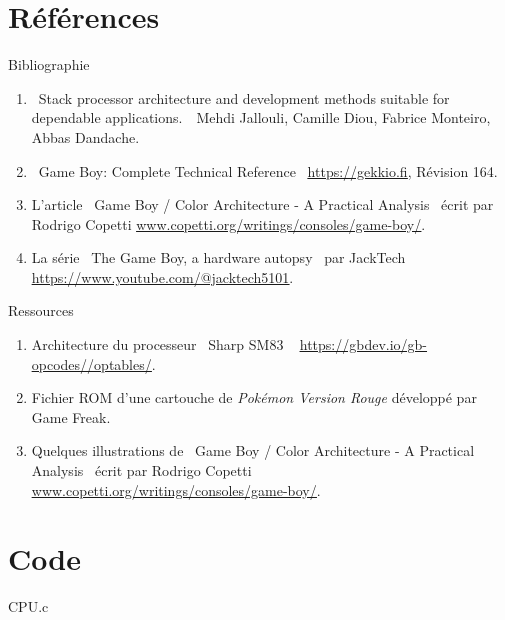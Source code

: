 \documentclass{beamer}
\begin{document}
    \appendix
    \section{Références}
    \begin{frame}{Bibliographie}
        \begin{enumerate}
            \item \guillemotleft\ Stack processor architecture and development methods suitable for dependable
applications.\ \guillemotright\ Mehdi Jallouli, Camille Diou, Fabrice Monteiro, Abbas Dandache.
            \item \guillemotleft\ Game Boy: Complete Technical Reference \guillemotright\ {\color{blue}\underline{\url{https://gekkio.fi}}}, Révision 164.
            \item L'article \guillemotleft\ Game Boy / Color Architecture - A Practical Analysis \guillemotright\ écrit par Rodrigo Copetti {\color{blue} \underline{\href{https://www.copetti.org/writings/consoles/game-boy/}{www.copetti.org/writings/consoles/game-boy/}}}.
            \item La série \guillemotleft\ The Game Boy, a hardware autopsy \guillemotright\ par JackTech {\color{blue} \underline{\url{https://www.youtube.com/@jacktech5101}}}.
        \end{enumerate}
    \end{frame}

    \begin{frame}{Ressources}
        \begin{enumerate}
            \item Architecture du processeur \guillemotleft\ Sharp SM83 \guillemotright\ {\color{blue} \underline{\url{https://gbdev.io/gb-opcodes//optables/}}}.
            \item Fichier ROM d'une cartouche de \textit{Pokémon Version Rouge} développé par Game Freak.
            \item Quelques illustrations de \guillemotleft\ Game Boy / Color Architecture - A Practical Analysis \guillemotright\ écrit par Rodrigo Copetti {\color{blue} \underline{\href{https://www.copetti.org/writings/consoles/game-boy/}{www.copetti.org/writings/consoles/game-boy/}}}.
        \end{enumerate}
    \end{frame}

    \section{Code}
    \begin{frame}{CPU.c}
    \end{frame}
    
\end{document}
